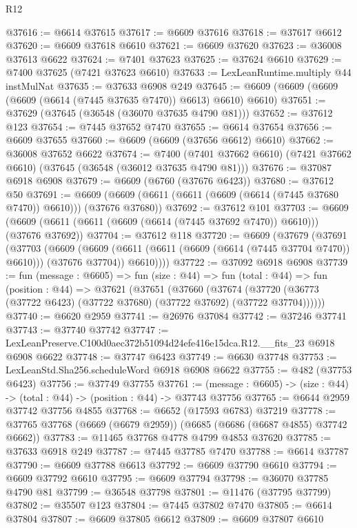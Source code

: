 \begin{lexlean}{R12}
\begin{coremodule}
@37616 := @6614 @37615
@37617 := @6609 @37616
@37618 := @37617 @6612
@37620 := @6609 @37618 @6610
@37621 := @6609 @37620
@37623 := @36008 @37613 @6622
@37624 := @7401 @37623
@37625 := @37624 @6610
@37629 := @7400 @37625 (@7421 @37623 @6610)
@37633 := LexLeanRuntime.multiply @44 instMulNat
@37635 := @37633 @6908 @249
@37645 := @6609 (@6609 (@6609 (@6609 (@6614 (@7445 @37635 @7470)) @6613) @6610) @6610)
@37651 := @37629 (@37645 (@36548 (@36070 @37635 @4790 @81)))
@37652 := @37612 @123
@37654 := @7445 @37652 @7470
@37655 := @6614 @37654
@37656 := @6609 @37655
@37660 := @6609 (@6609 (@37656 @6612) @6610)
@37662 := @36008 @37652 @6622
@37674 := @7400
    (@7401 @37662 @6610)
    (@7421 @37662 @6610)
    (@37645 (@36548 (@36012 @37635 @4790 @81)))
@37676 := @37087 @6918 @6908
@37679 := @6609 (@6760 (@37676 @6423))
@37680 := @37612 @50
@37691 := @6609 (@6609 (@6611 (@6611 (@6609 (@6614 (@7445 @37680 @7470)) @6610))) (@37676 @37680))
@37692 := @37612 @101
@37703 := @6609 (@6609 (@6611 (@6611 (@6609 (@6614 (@7445 @37692 @7470)) @6610))) (@37676 @37692))
@37704 := @37612 @118
@37720 := @6609
    (@37679
      (@37691
        (@37703
          (@6609
            (@6609 (@6611 (@6611 (@6609 (@6614 (@7445 @37704 @7470)) @6610))) (@37676 @37704))
            @6610))))
@37722 := @37092 @6918 @6908
@37739 := fun (message : @6605) =>
  fun (size : @44) =>
  fun (total : @44) =>
  fun (position : @44) =>
  @37621
    (@37651
      (@37660
        (@37674 (@37720 (@36773 (@37722 @6423) (@37722 @37680) (@37722 @37692) (@37722 @37704))))))
@37740 := @6620 @2959
@37741 := @26976 @37084
@37742 := @37246 @37741
@37743 := @37740 @37742
@37747 := LexLeanPreserve.C100d0aec372b51094d24efe416e15dca.R12.__fits_23 @6918 @6908 @6622
@37748 := @37747 @6423
@37749 := @6630 @37748
@37753 := LexLeanStd.Sha256.scheduleWord @6918 @6908 @6622
@37755 := @482 (@37753 @6423)
@37756 := @37749 @37755
@37761 := (message : @6605) -> (size : @44) -> (total : @44) -> (position : @44) -> @37743 @37756
@37765 := @6644 @2959 @37742 @37756 @4855
@37768 := @6652 (@17593 @6783) @37219
@37778 := @37765 @37768 (@6669 (@6679 @2959)) (@6685 (@6686 (@6687 @4855) @37742 @6662))
@37783 := @11465 @37768 @4778 @4799 @4853 @37620
@37785 := @37633 @6918 @249
@37787 := @7445 @37785 @7470
@37788 := @6614 @37787
@37790 := @6609 @37788 @6613
@37792 := @6609 @37790 @6610
@37794 := @6609 @37792 @6610
@37795 := @6609 @37794
@37798 := @36070 @37785 @4790 @81
@37799 := @36548 @37798
@37801 := @11476 (@37795 @37799)
@37802 := @35507 @123
@37804 := @7445 @37802 @7470
@37805 := @6614 @37804
@37807 := @6609 @37805 @6612
@37809 := @6609 @37807 @6610

\end{coremodule}
\end{lexlean}
